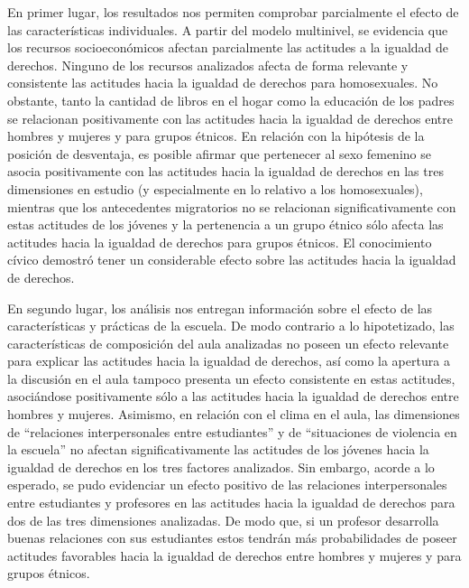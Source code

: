 \documentclass[12pt,twoside]{templates/facsothesis}
\begin{document}
En primer lugar, los resultados nos permiten comprobar parcialmente el efecto de las características individuales. A partir del modelo multinivel, se evidencia que los recursos socioeconómicos afectan parcialmente las actitudes a la igualdad de derechos. Ninguno de los recursos analizados afecta de forma relevante y consistente las actitudes hacia la igualdad de derechos para homosexuales. No obstante, tanto la cantidad de libros en el hogar como la educación de los padres se relacionan positivamente con las actitudes hacia la igualdad de derechos entre hombres y mujeres y para grupos étnicos. En relación con la hipótesis de la posición de desventaja, es posible afirmar que pertenecer al sexo femenino se asocia positivamente con las actitudes hacia la igualdad de derechos en las tres dimensiones en estudio (y especialmente en lo relativo a los homosexuales), mientras que los antecedentes migratorios no se relacionan significativamente con estas actitudes de los jóvenes y la pertenencia a un grupo étnico sólo afecta las actitudes hacia la igualdad de derechos para grupos étnicos. El conocimiento cívico demostró tener un considerable efecto sobre las actitudes hacia la igualdad de derechos.

En segundo lugar, los análisis nos entregan información sobre el efecto de las características y prácticas de la escuela. De modo contrario a lo hipotetizado, las características de composición del aula analizadas no poseen un efecto relevante para explicar las actitudes hacia la igualdad de derechos, así como la apertura a la discusión en el aula tampoco presenta un efecto consistente en estas actitudes, asociándose positivamente sólo a las actitudes hacia la igualdad de derechos entre hombres y mujeres. Asimismo, en relación con el clima en el aula, las dimensiones de ``relaciones interpersonales entre estudiantes'' y de ``situaciones de violencia en la escuela'' no afectan significativamente las actitudes de los jóvenes hacia la igualdad de derechos en los tres factores analizados. Sin embargo, acorde a lo esperado, se pudo evidenciar un efecto positivo de las relaciones interpersonales entre estudiantes y profesores en las actitudes hacia la igualdad de derechos para dos de las tres dimensiones analizadas. De modo que, si un profesor desarrolla buenas relaciones con sus estudiantes estos tendrán más probabilidades de poseer actitudes favorables hacia la igualdad de derechos entre hombres y mujeres y para grupos étnicos.
\end{document}

